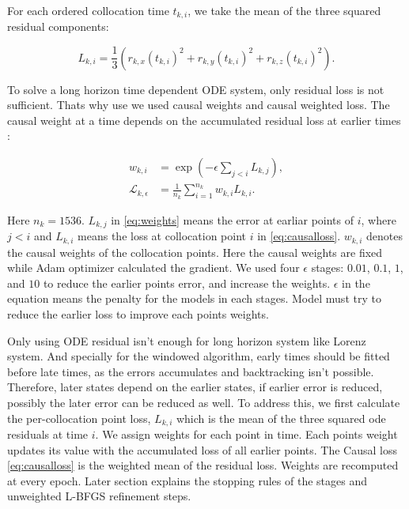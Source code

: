 \documentclass[conference]{IEEEtran}
\begin{document}
For each ordered collocation time $t_{k,i}$, we take the mean of the three squared residual components:

\begin{equation}
L_{k,i}
  = \frac{1}{3}\left(
      r_{k,x}(t_{k,i})^2+
      r_{k,y}(t_{k,i})^2+
      r_{k,z}(t_{k,i})^2
    \right).
\label{eq:pointloss}
\end{equation}

To solve a long horizon time dependent ODE system, only residual loss is not sufficient. Thats why use we used causal weights and causal weighted loss. The causal weight at a time depends on the accumulated residual loss at earlier times \cite{wang2024causal}:

\begin{align}
w_{k,i}
  &= \exp\left(-\epsilon\sum_{j<i}L_{k,j}\right),
     \label{eq:weights}\\
\mathcal{L}_{k,\epsilon}
  &= \frac{1}{n_k}\sum_{i=1}^{n_k}w_{k,i}L_{k,i}.
     \label{eq:causalloss}
\end{align}

Here $n_k=1536$. $L_{k,j}$ in \eqref{eq:weights} means the error at earliar points of $i$, where $j < i$ and $L_{k,i}$ means the loss at collocation point $i$ in \eqref{eq:causalloss}. $w_{k,i}$ denotes the causal weights of the collocation points. Here the causal weights are fixed while Adam optimizer calculated the gradient. We used four $\epsilon$ stages: $0.01$, $0.1$, $1$, and $10$  to reduce the earlier points error, and increase the weights. $\epsilon$ in the equation means the penalty for the models in each stages. Model must try to reduce the earlier loss to improve each points weights.

Only using ODE residual isn't enough for long horizon system like Lorenz system. And specially for the windowed algorithm, early times should be fitted before late times, as the errors accumulates and backtracking isn't possible. Therefore, later states depend on the earlier states, if earlier error is reduced, possibly the later error can be reduced as well. To address this, we first calculate the per-collocation point loss, $L_{k,i}$ which is the mean of the three squared ode residuals at time $i$. We assign weights for each point in time. Each points weight updates its value with the accumulated loss of all earlier points. The Causal loss \eqref{eq:causalloss} is the weighted mean of the residual loss. Weights are recomputed at every epoch. Later section explains the stopping rules of the stages and unweighted L-BFGS refinement steps. 
\end{document}
